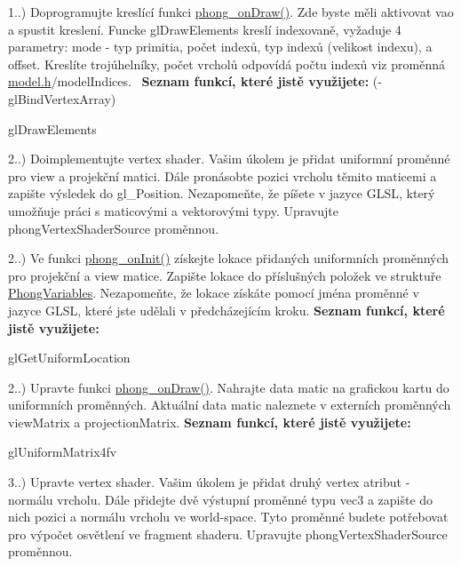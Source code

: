 \begin{DoxyRefList}
1..) Doprogramujte kreslící funkci \hyperlink{student_8h_a53ffbb1a271d285abdaf7a029192f47e}{phong\+\_\+on\+Draw()}. Zde byste měli aktivovat vao a spustit kreslení. Funcke gl\+Draw\+Elements kreslí indexovaně, vyžaduje 4 parametry\+: mode -\/ typ primitia, počet indexů, typ indexů (velikost indexu), a offset. Kreslíte trojúhelníky, počet vrcholů odpovídá počtu indexů viz proměnná \hyperlink{model_8h}{model.\+h}/model\+Indices.~\newline
 {\bfseries Seznam funkcí, které jistě využijete\+:} (-\/ gl\+Bind\+Vertex\+Array)
\begin{DoxyItemize}
\item gl\+Draw\+Elements  
\end{DoxyItemize}
\item[\label{todo__todo000001}%
\hypertarget{todo__todo000001}{}%
Module \hyperlink{group__task2}{task2} ]2..) Doimplementujte vertex shader. Vašim úkolem je přidat uniformní proměnné pro view a projekční matici. Dále pronásobte pozici vrcholu těmito maticemi a zapište výsledek do gl\+\_\+\+Position. Nezapomeňte, že píšete v jazyce G\+L\+S\+L, který umožňuje práci s maticovými a vektorovými typy. Upravujte phong\+Vertex\+Shader\+Source proměnnou. 

2..) Ve funkci \hyperlink{student_8h_ac2adb2ba4e748239b9db4d037584d3cc}{phong\+\_\+on\+Init()} získejte lokace přidaných uniformních proměnných pro projekční a view matice. Zapište lokace do příslušných položek ve struktuře \hyperlink{structPhongVariables}{Phong\+Variables}. Nezapomeňte, že lokace získáte pomocí jména proměnné v jazyce G\+L\+S\+L, které jste udělali v předcházejícím kroku. {\bfseries Seznam funkcí, které jistě využijete\+:}
\begin{DoxyItemize}
\item gl\+Get\+Uniform\+Location 
\end{DoxyItemize}

2..) Upravte funkci \hyperlink{student_8h_a53ffbb1a271d285abdaf7a029192f47e}{phong\+\_\+on\+Draw()}. Nahrajte data matic na grafickou kartu do uniformních proměnných. Aktuální data matic naleznete v externích proměnných view\+Matrix a projection\+Matrix. {\bfseries Seznam funkcí, které jistě využijete\+:}
\begin{DoxyItemize}
\item gl\+Uniform\+Matrix4fv  
\end{DoxyItemize}
\item[\label{todo__todo000002}%
\hypertarget{todo__todo000002}{}%
Module \hyperlink{group__task3}{task3} ]3..) Upravte vertex shader. Vašim úkolem je přidat druhý vertex atribut -\/ normálu vrcholu. Dále přidejte dvě výstupní proměnné typu vec3 a zapište do nich pozici a normálu vrcholu ve world-\/space. Tyto proměnné budete potřebovat pro výpočet osvětlení ve fragment shaderu. Upravujte phong\+Vertex\+Shader\+Source proměnnou. 


\end{DoxyRefList}
